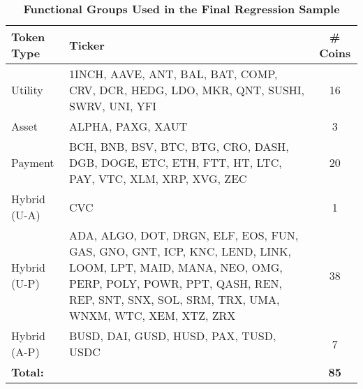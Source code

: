 \begin{table}[ht]
\centering
\scriptsize
\setlength{\tabcolsep}{4pt}
\begin{tabular}{p{3cm}p{10cm}c}
\toprule
\textbf{Token Type} & \textbf{Ticker} & \textbf{\# Coins} \\
\midrule
Utility & 1INCH, AAVE, ANT, BAL, BAT, COMP, CRV, DCR, HEDG, LDO, MKR, QNT, SUSHI, SWRV, UNI, YFI & 16 \\
\addlinespace
Asset & ALPHA, PAXG, XAUT & 3 \\
\addlinespace
Payment & BCH, BNB, BSV, BTC, BTG, CRO, DASH, DGB, DOGE, ETC, ETH, FTT, HT, LTC, PAY, VTC, XLM, XRP, XVG, ZEC & 20 \\
\addlinespace
Hybrid (U-A) & CVC & 1 \\
\addlinespace
Hybrid (U-P) & ADA, ALGO, DOT, DRGN, ELF, EOS, FUN, GAS, GNO, GNT, ICP, KNC, LEND, LINK, LOOM, LPT, MAID, MANA, NEO, OMG, PERP, POLY, POWR, PPT, QASH, REN, REP, SNT, SNX, SOL, SRM, TRX, UMA, WNXM, WTC, XEM, XTZ, ZRX & 38 \\
\addlinespace
Hybrid (A-P) & BUSD, DAI, GUSD, HUSD, PAX, TUSD, USDC & 7 \\
\addlinespace
\textbf{Total:} & & \textbf{85} \\
\bottomrule
\end{tabular}
\caption{\textbf{Functional Groups Used in the Final Regression Sample}}
\label{tab:functional_groups_effective_sample}
\end{table}